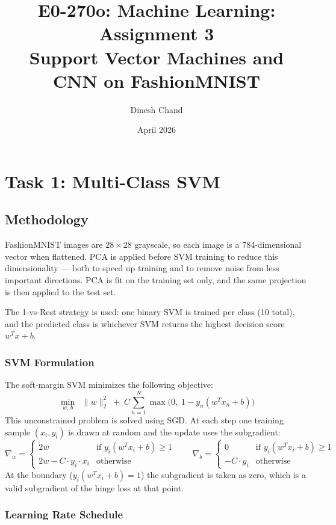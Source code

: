 \documentclass[12pt,a4paper]{article}
\title{\textbf{E0-270o: Machine Learning: Assignment 3}\\[0.5em]
       \large Support Vector Machines and CNN on FashionMNIST}
\author{Dinesh Chand}
\date{April 2026}
\begin{document}
\maketitle

\section{Task 1: Multi-Class SVM}

\subsection{Methodology}

FashionMNIST images are $28 \times 28$ grayscale, so each image is a 784-dimensional
vector when flattened. PCA is applied before SVM training to reduce this
dimensionality — both to speed up training and to remove noise from less important
directions. PCA is fit on the training set only, and the same projection is then
applied to the test set.

The 1-vs-Rest strategy is used: one binary SVM is trained per class (10 total), and
the predicted class is whichever SVM returns the highest decision score $w^Tx + b$.

\subsubsection{SVM Formulation}

The soft-margin SVM minimizes the following objective:
\[
\min_{w,\, b} \;\; \|w\|_2^2 \;+\; C \sum_{n=1}^{N} \max\!\bigl(0,\; 1 - y_n(w^T x_n + b)\bigr)
\]
This unconstrained problem is solved using SGD. At each step one training sample
$(x_i, y_i)$ is drawn at random and the update uses the subgradient:
\[
\nabla_w =
\begin{cases}
2w & \text{if } y_i(w^Tx_i + b) \geq 1 \\
2w - C \cdot y_i \cdot x_i & \text{otherwise}
\end{cases}
\qquad
\nabla_b =
\begin{cases}
0 & \text{if } y_i(w^Tx_i + b) \geq 1 \\
-C \cdot y_i & \text{otherwise}
\end{cases}
\]
At the boundary ($y_i(w^Tx_i + b) = 1$) the subgradient is taken as zero, which is
a valid subgradient of the hinge loss at that point.

\subsubsection{Learning Rate Schedule}
\end{document}
